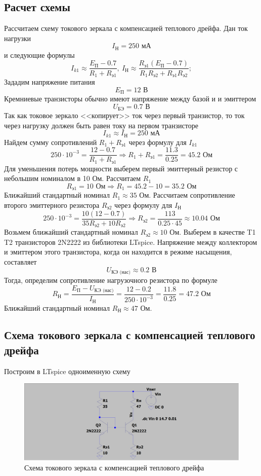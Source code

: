 \documentclass[a4paper, 12pt]{article}
\begin{document}
    \subsection{Расчет схемы}
    Рассчитаем схему токового зеркала с компенсацией теплового дрейфа.
    Дан ток нагрузки $$I_\text{Н}=250\text{ мА}$$
    и следующие формулы
    $$
    I_{k1}\approx\dfrac{E_\text{П}-0.7}{R_1+R_\text{э1}},\ I_\text{Н}\approx\dfrac{R_\text{э1}\left( E_\text{П}-0.7 \right)}{R_1R_\text{э2}+R_\text{э1}R_\text{э2}};
    $$
    Зададим напряжение питания $$E_\text{П}=12\text{ В}$$
    Кремниевые транзисторы обычно имеют напряжение между базой и и эмиттером
    $$
    U_\text{БЭ}=0.7\text{ В}
    $$
    Так как токовое зеркало <<копирует>> ток через первый транзистор, то ток через
    нагрузку должен быть равен току на первом транзисторе
    $$
    I_{k1}\approx I_\text{Н}=250\text{ мА}
    $$
    Найдем сумму сопротивлений $R_1+R_\text{э1}$ через формулу для $I_{k1}$
    $$
    250\cdot10^{-3}=\dfrac{12-0.7}{R_1+R_\text{э1}}\Rightarrow R_1+R_\text{э1}=\dfrac{11.3}{0.25}=45.2\text{ Ом}
    $$
    Для уменьшения потерь мощности выберем первый эмиттерный резистор с небольшим номиналом в 10 Ом. Рассчитаем $R_1$
    $$
    R_\text{э1}=10\text{ Ом}\Rightarrow R_1=45.2-10=35.2\text{ Ом}
    $$
    Ближайший стандартный номинал $R_1\approx35$ Ом. Рассчитаем сопротивление второго эмиттерного резистора $R_\text{э2}$ через формулу для $I_\text{Н}$
    $$
    250\cdot10^{-3}=\dfrac{10\left( 12-0.7 \right)}{35R_\text{э2}+10R_\text{э2}}\Rightarrow R_\text{э2}=\dfrac{113}{0.25\cdot45}\approx10.04\text{ Ом}
    $$
    Возьмем ближайший стандартный номинал $R_\text{э2}\approx10$ Ом. Выберем в качестве T1 T2 транзисторов 2N2222 из библиотеки LTspice.
    Напряжение между коллектором и эмиттером этого транзистора, когда он находится в режиме насыщения, составляет
    $$
    U_\text{КЭ (нас)}\approx0.2\text{ В}
    $$
    Тогда, определим сопротивление нагрузочного резистора по формуле
    $$
    R_\text{Н}=\dfrac{E_\text{П}-U_\text{КЭ (нас)}}{I_\text{Н}}=\dfrac{12-0.2}{250\cdot10^{-3}}=\dfrac{11.8}{0.25}=47.2\text{ Ом}
    $$
    Ближайший стандартный номинал $R_\text{Н}\approx47$ Ом.


    \subsection{Схема токового зеркала с компенсацией теплового дрейфа}
    Построим в LTspice одноименную схему
    \begin{figure}[H]
        \centering
        \includegraphics[scale=0.22]{scheme1.png}
        \captionsetup{skip=0pt}
        \caption{Схема токового зеркала с компенсацией теплового дрейфа}
        \label{fig:scheme1}
    \end{figure}
\end{document}
